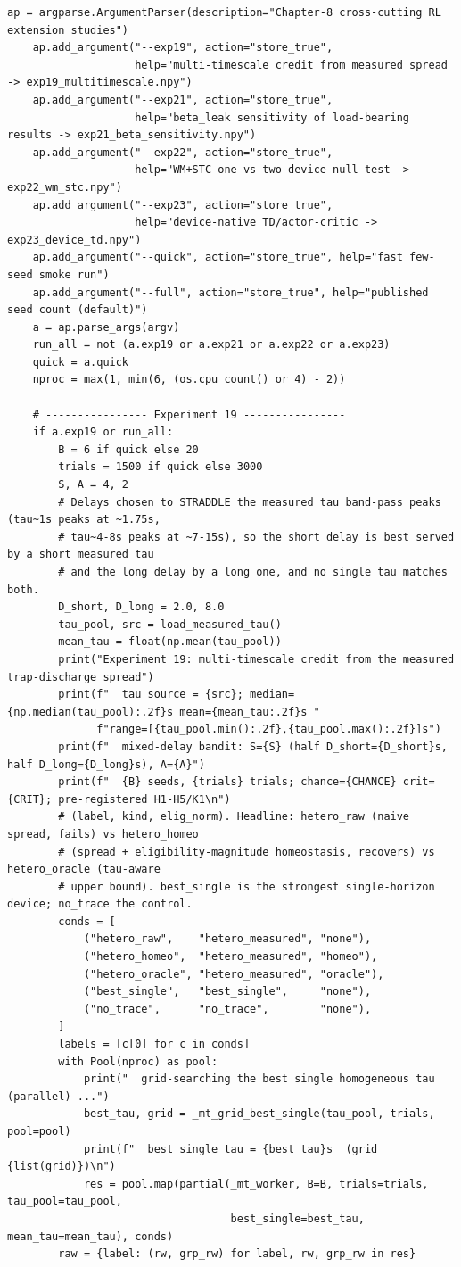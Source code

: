 \begin{lstlisting}[caption={mrl\_trace/extensions.py},label={lst:siox-src-extensions}]
    ap = argparse.ArgumentParser(description="Chapter-8 cross-cutting RL extension studies")
    ap.add_argument("--exp19", action="store_true",
                    help="multi-timescale credit from measured spread -> exp19_multitimescale.npy")
    ap.add_argument("--exp21", action="store_true",
                    help="beta_leak sensitivity of load-bearing results -> exp21_beta_sensitivity.npy")
    ap.add_argument("--exp22", action="store_true",
                    help="WM+STC one-vs-two-device null test -> exp22_wm_stc.npy")
    ap.add_argument("--exp23", action="store_true",
                    help="device-native TD/actor-critic -> exp23_device_td.npy")
    ap.add_argument("--quick", action="store_true", help="fast few-seed smoke run")
    ap.add_argument("--full", action="store_true", help="published seed count (default)")
    a = ap.parse_args(argv)
    run_all = not (a.exp19 or a.exp21 or a.exp22 or a.exp23)
    quick = a.quick
    nproc = max(1, min(6, (os.cpu_count() or 4) - 2))

    # ---------------- Experiment 19 ----------------
    if a.exp19 or run_all:
        B = 6 if quick else 20
        trials = 1500 if quick else 3000
        S, A = 4, 2
        # Delays chosen to STRADDLE the measured tau band-pass peaks (tau~1s peaks at ~1.75s,
        # tau~4-8s peaks at ~7-15s), so the short delay is best served by a short measured tau
        # and the long delay by a long one, and no single tau matches both.
        D_short, D_long = 2.0, 8.0
        tau_pool, src = load_measured_tau()
        mean_tau = float(np.mean(tau_pool))
        print("Experiment 19: multi-timescale credit from the measured trap-discharge spread")
        print(f"  tau source = {src}; median={np.median(tau_pool):.2f}s mean={mean_tau:.2f}s "
              f"range=[{tau_pool.min():.2f},{tau_pool.max():.2f}]s")
        print(f"  mixed-delay bandit: S={S} (half D_short={D_short}s, half D_long={D_long}s), A={A}")
        print(f"  {B} seeds, {trials} trials; chance={CHANCE} crit={CRIT}; pre-registered H1-H5/K1\n")
        # (label, kind, elig_norm). Headline: hetero_raw (naive spread, fails) vs hetero_homeo
        # (spread + eligibility-magnitude homeostasis, recovers) vs hetero_oracle (tau-aware
        # upper bound). best_single is the strongest single-horizon device; no_trace the control.
        conds = [
            ("hetero_raw",    "hetero_measured", "none"),
            ("hetero_homeo",  "hetero_measured", "homeo"),
            ("hetero_oracle", "hetero_measured", "oracle"),
            ("best_single",   "best_single",     "none"),
            ("no_trace",      "no_trace",        "none"),
        ]
        labels = [c[0] for c in conds]
        with Pool(nproc) as pool:
            print("  grid-searching the best single homogeneous tau (parallel) ...")
            best_tau, grid = _mt_grid_best_single(tau_pool, trials, pool=pool)
            print(f"  best_single tau = {best_tau}s  (grid {list(grid)})\n")
            res = pool.map(partial(_mt_worker, B=B, trials=trials, tau_pool=tau_pool,
                                   best_single=best_tau, mean_tau=mean_tau), conds)
        raw = {label: (rw, grp_rw) for label, rw, grp_rw in res}


\end{lstlisting}
